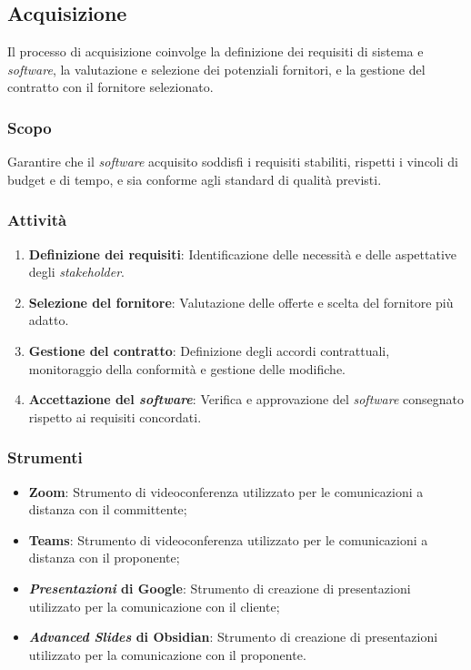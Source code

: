 \subsection{Acquisizione}

Il processo di acquisizione coinvolge la definizione dei requisiti di sistema e
\textit{software}, la valutazione e selezione dei potenziali fornitori, e la gestione del
contratto con il fornitore selezionato.

\subsubsection{Scopo}
Garantire che il \textit{software} acquisito soddisfi i requisiti stabiliti, rispetti i
vincoli di budget e di tempo, e sia conforme agli standard di qualità previsti.

\subsubsection{Attività}
\begin{enumerate}
	\item \textbf{Definizione dei requisiti}: Identificazione delle necessità e
	      delle aspettative degli \textit{stakeholder}.
	\item \textbf{Selezione del fornitore}: Valutazione delle offerte e scelta
	      del fornitore più adatto.
	\item \textbf{Gestione del contratto}: Definizione degli accordi
	      contrattuali, monitoraggio della conformità e gestione delle
	      modifiche.
	\item \textbf{Accettazione del \textit{software}}: Verifica e approvazione
	      del \textit{software} consegnato rispetto ai requisiti concordati.
\end{enumerate}

\subsubsection{Strumenti}
\begin{itemize}
	\item \textbf{Zoom}: Strumento di videoconferenza utilizzato per le
	      comunicazioni a distanza con il committente;
	\item \textbf{Teams}: Strumento di videoconferenza utilizzato per le
	      comunicazioni a distanza con il proponente;
	\item \textbf{\textit{Presentazioni} di Google}: Strumento di creazione di
	      presentazioni utilizzato per la comunicazione con il cliente;
	\item \textbf{\textit{Advanced Slides} di Obsidian}: Strumento di creazione
	      di presentazioni utilizzato per la comunicazione con il proponente.
\end{itemize}

